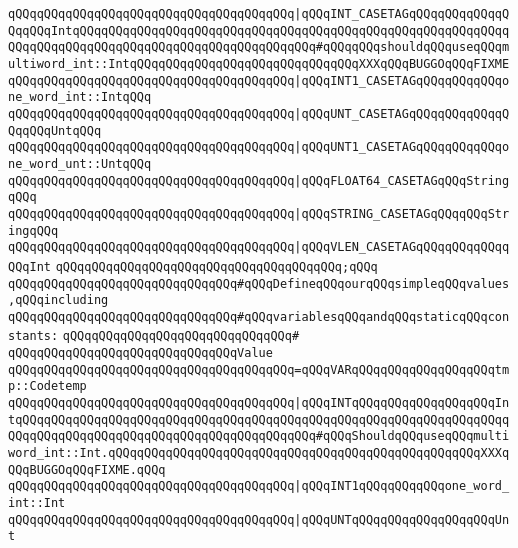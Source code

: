 \verb|qQQqqQQqqQQqqQQqqQQqqQQqqQQqqQQqqQQqqQQq|\verb#|qQQqINT_CASETAGqQQqqQQqqQQqqQQqqQQqIntqQQqqQQqqQQqqQQqqQQqqQQqqQQqqQQqqQQqqQQqqQQqqQQqqQQqqQQqqQQqqQQqqQQqqQQqqQQqqQQqqQQqqQQqqQQqqQQqqQQqqQQq#\verb|#qQQqqQQqshouldqQQquseqQQqmultiword_int::IntqQQqqQQqqQQqqQQqqQQqqQQqqQQqqQQqXXXqQQqBUGGOqQQqFIXME|\newline
\verb|qQQqqQQqqQQqqQQqqQQqqQQqqQQqqQQqqQQqqQQq|\verb#|qQQqINT1_CASETAGqQQqqQQqqQQqone_word_int::IntqQQq#\newline
\verb|qQQqqQQqqQQqqQQqqQQqqQQqqQQqqQQqqQQqqQQq|\verb#|qQQqUNT_CASETAGqQQqqQQqqQQqqQQqqQQqUntqQQq#\newline
\verb|qQQqqQQqqQQqqQQqqQQqqQQqqQQqqQQqqQQqqQQq|\verb#|qQQqUNT1_CASETAGqQQqqQQqqQQqone_word_unt::UntqQQq#\newline
\verb|qQQqqQQqqQQqqQQqqQQqqQQqqQQqqQQqqQQqqQQq|\verb#|qQQqFLOAT64_CASETAGqQQqStringqQQq#\newline
\verb|qQQqqQQqqQQqqQQqqQQqqQQqqQQqqQQqqQQqqQQq|\verb#|qQQqSTRING_CASETAGqQQqqQQqStringqQQq#\newline
\verb|qQQqqQQqqQQqqQQqqQQqqQQqqQQqqQQqqQQqqQQq|\verb#|qQQqVLEN_CASETAGqQQqqQQqqQQqqQQqInt#\newline
\verb|qQQqqQQqqQQqqQQqqQQqqQQqqQQqqQQqqQQqqQQq;qQQq|\newline
\newline
\newline
\verb|qQQqqQQqqQQqqQQqqQQqqQQqqQQqqQQq#qQQqDefineqQQqourqQQqsimpleqQQqvalues,qQQqincluding|\newline
\verb|qQQqqQQqqQQqqQQqqQQqqQQqqQQqqQQq#qQQqvariablesqQQqandqQQqstaticqQQqconstants:|\newline
\verb|qQQqqQQqqQQqqQQqqQQqqQQqqQQqqQQq#|\newline
\verb|qQQqqQQqqQQqqQQqqQQqqQQqqQQqqQQqValue|\newline
\verb|qQQqqQQqqQQqqQQqqQQqqQQqqQQqqQQqqQQqqQQq=qQQqVARqQQqqQQqqQQqqQQqqQQqtmp::Codetemp|\newline
\verb|qQQqqQQqqQQqqQQqqQQqqQQqqQQqqQQqqQQqqQQq|\verb#|qQQqINTqQQqqQQqqQQqqQQqqQQqIntqQQqqQQqqQQqqQQqqQQqqQQqqQQqqQQqqQQqqQQqqQQqqQQqqQQqqQQqqQQqqQQqqQQqqQQqqQQqqQQqqQQqqQQqqQQqqQQqqQQqqQQqqQQqqQQq#\verb|#qQQqShouldqQQquseqQQqmultiword_int::Int.qQQqqQQqqQQqqQQqqQQqqQQqqQQqqQQqqQQqqQQqqQQqqQQqqQQqXXXqQQqBUGGOqQQqFIXME.qQQq|\newline
\verb|qQQqqQQqqQQqqQQqqQQqqQQqqQQqqQQqqQQqqQQq|\verb#|qQQqINT1qQQqqQQqqQQqone_word_int::Int#\newline
\verb|qQQqqQQqqQQqqQQqqQQqqQQqqQQqqQQqqQQqqQQq|\verb#|qQQqUNTqQQqqQQqqQQqqQQqqQQqUnt#\newline
